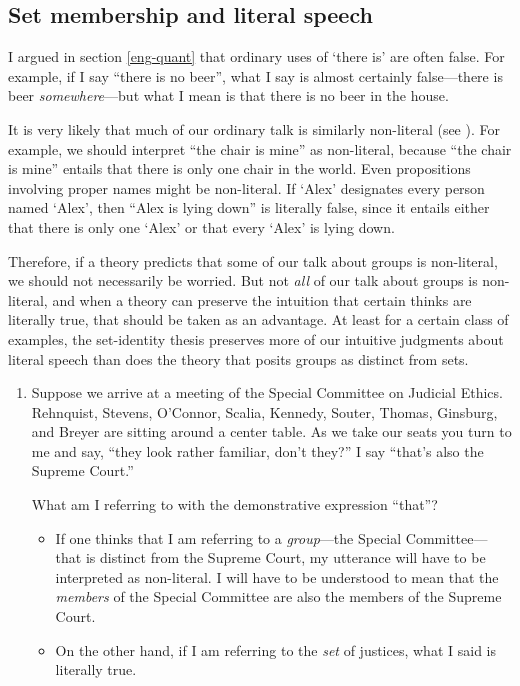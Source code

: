 \documentclass[11pt]{article}
\begin{document}
\begin{spacing}{1.5}
\subsection{Set membership and literal speech}
\label{implicate}
I argued in section \ref{eng-quant} that ordinary uses of `there is'
are often false.  For example, if I say ``there is no beer'', what I
say is almost certainly false---there is beer {\em somewhere}---but
what I mean is that there is no beer in the house.

It is very likely that much of our ordinary talk is similarly
non-literal (see \citet{bach1987}).  For example, we should interpret
``the chair is mine'' as non-literal, because ``the chair is mine''
entails that there is only one chair in the world.  Even propositions
involving proper names might be non-literal.  If `Alex' designates
every person named `Alex', then ``Alex is lying down'' is literally
false, since it entails either that there is only one `Alex' or that
every `Alex' is lying down.

Therefore, if a theory predicts that some of our talk about groups is
non-literal, we should not necessarily be worried.  But not {\em all}
of our talk about groups is non-literal, and when a theory can
preserve the intuition that certain thinks are literally true, that
should be taken as an advantage.  At least for a certain class of
examples, the set-identity thesis preserves more of our intuitive
judgments about literal speech than does the theory that posits
groups as distinct from sets.

\begin{enumerate}
  \item Suppose we arrive at a meeting of the Special Committee on
    Judicial Ethics.  Rehnquist, Stevens, O'Connor, Scalia, Kennedy,
    Souter, Thomas, Ginsburg, and Breyer are sitting around a center
    table.  As we take our seats you turn to me and say, ``they look
    rather familiar, don't they?''  I say ``that's also the Supreme
    Court.''

    What am I referring to with the demonstrative expression ``that''?
    \begin{itemize}
      \item If one thinks that I am referring to a {\em group}---the
        Special Committee---that is distinct from the Supreme Court,
        my utterance will have to be interpreted as non-literal.  I
        will have to be understood to mean that the {\em members} of
        the Special Committee are also the members of the Supreme
        Court.
      \item On the other hand, if I am referring to the {\em set}
        of justices, what I said is literally true.
     \end{itemize}


\end{enumerate}
\end{spacing}
\end{document}
